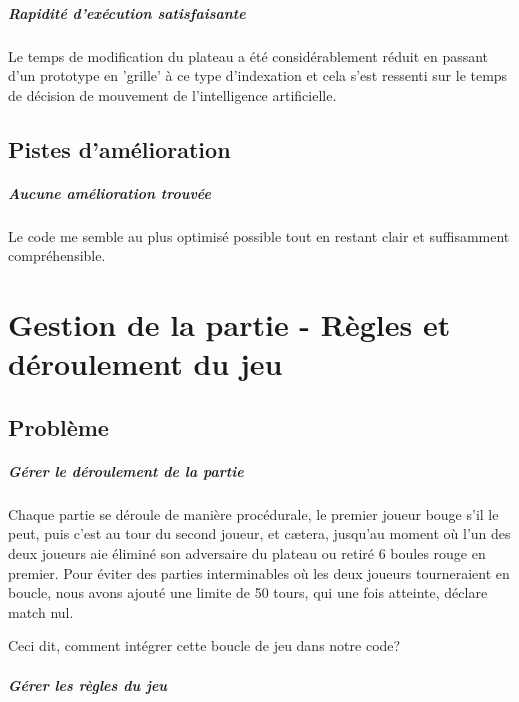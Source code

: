 \documentclass{scrreprt}
\begin{document}
			\paragraph{Rapidité d'exécution satisfaisante} 
			
			Le temps de modification du plateau a été considérablement réduit en passant d'un prototype en 'grille' à ce type d'indexation et cela s'est ressenti sur le temps de décision de mouvement de l'intelligence artificielle.
		
		\section{Pistes d'amélioration}
			\paragraph{Aucune amélioration trouvée} 
			
			Le code me semble au plus optimisé possible tout en restant clair et suffisamment compréhensible.
			
			
	\chapter{Gestion de la partie - Règles et déroulement du jeu}
		\section{Problème}
		
			\paragraph{Gérer le déroulement de la partie}
			
			Chaque partie se déroule de manière procédurale, le premier joueur bouge s'il le peut, puis c'est au tour du second joueur, et cætera, jusqu'au moment où l'un des deux joueurs aie éliminé son adversaire du plateau ou retiré 6 boules rouge en premier. Pour éviter des parties interminables où les deux joueurs tourneraient en boucle, nous avons ajouté une limite de 50 tours, qui une fois atteinte, déclare match nul. 
			
			Ceci dit, comment intégrer cette boucle de jeu dans notre code?
			
			\paragraph{Gérer les règles du jeu}
			
\end{document}
